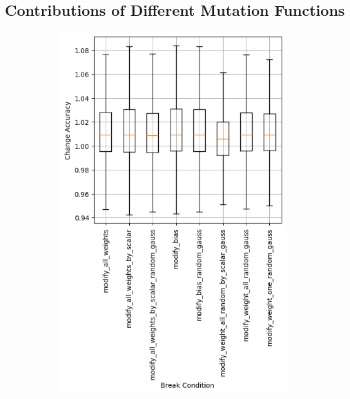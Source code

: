 \subsection{Contributions of Different Mutation Functions}\label{subsec:contributions-of-different-mutation-functions}
\begin{figure}
    \begin{subfigure}{0.5\textwidth}
        \centering
        \includegraphics[width=0.95\textwidth]{plots/Mutatation_Trained_accuracy.png}
    \end{subfigure}
    \begin{subfigure}{0.5\textwidth}
        \centering

\end{subfigure}
\end{figure}
